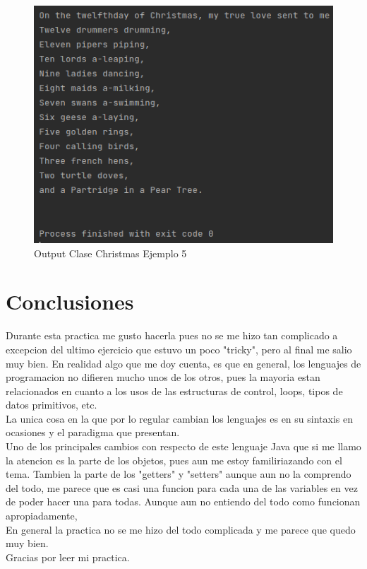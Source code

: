 \documentclass{article}
\begin{document}
\begin{figure}[H]
	\centering
	\includegraphics[scale = 0.8]{images/xmas5.png}
	\caption{Output Clase Christmas Ejemplo 5}
\end{figure}
\newpage
\section{Conclusiones}

Durante esta practica me gusto hacerla pues no se me hizo tan complicado a excepcion del ultimo ejercicio que estuvo un poco "tricky", pero al final me salio muy bien. En realidad algo que me doy cuenta, es que en general, los lenguajes de programacion no difieren mucho unos de los otros, pues la mayoria estan relacionados en cuanto a los usos de las estructuras de control, loops, tipos de datos primitivos, etc.\\

La unica cosa en la que por lo regular cambian los lenguajes es en su sintaxis en ocasiones y el paradigma que presentan.\\

Uno de los principales cambios con respecto de este lenguaje Java que si me llamo la atencion es la parte de los objetos, pues aun me estoy familiriazando con el tema. Tambien la parte de los "getters" y "setters" aunque aun no la comprendo del todo, me parece que es casi una funcion para cada una de las variables en vez de poder hacer una para todas. Aunque aun no entiendo del todo como funcionan apropiadamente,\\ 

En general la practica no se me hizo del todo complicada y me parece que quedo muy bien.\\

Gracias por leer mi practica.
\end{document}
